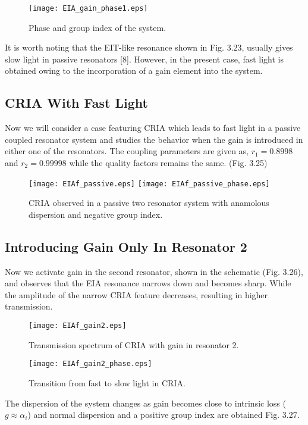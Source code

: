 \begin{figure}[h]
\centering
\texttt{[image: EIA\_gain\_phase1.eps]}
\caption{Phase and group index of the system.}
\end{figure}

It is worth noting that the EIT-like resonance shown in Fig. 3.23, usually gives slow light in passive resonators [8]. However, in the present case, fast light is obtained owing to the incorporation of a gain element into the system.

\subsection{CRIA With Fast Light}
Now we will consider a case featuring CRIA which leads to fast light in a passive coupled resonator system and studies the behavior when the gain is introduced in either one of the resonators. The coupling parameters are given as, $r_{1} = 0.8998$ and $r_{2} = 0.99998$ while the quality factors remains the same. (Fig. 3.25)

\begin{figure}[h]
\centering
\texttt{[image: EIAf\_passive.eps]}
\texttt{[image: EIAf\_passive\_phase.eps]}
\caption{CRIA observed in a passive two resonator system with anamolous dispersion and negative group index.}
\end{figure}

\subsection{Introducing Gain Only In Resonator 2}
Now we activate gain in the second resonator, shown in the schematic (Fig. 3.26), and observes that the EIA resonance narrows down and becomes sharp. While the amplitude of the narrow CRIA feature decreases, resulting in higher transmission. 

\begin{figure}[h]
\centering 
\texttt{[image: EIAf\_gain2.eps]}
\caption{Transmission spectrum of CRIA with gain in resonator 2.}
\end{figure}


\begin{figure}[h]
\centering
\texttt{[image: EIAf\_gain2\_phase.eps]}
\caption{Transition from fast to slow light in CRIA.}
\end{figure}

The dispersion of the system changes as gain becomes close to intrinsic loss ($g \approx \alpha_{i}$) and normal dispersion and a positive group index are obtained Fig. 3.27.

